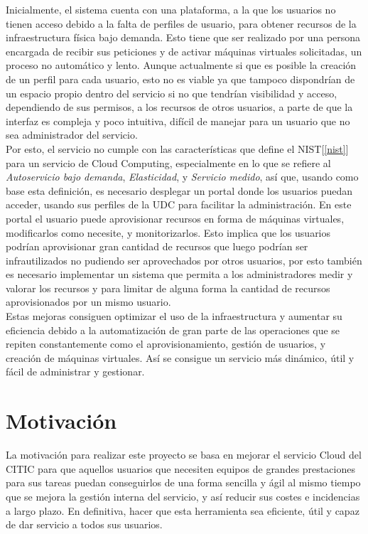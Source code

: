 Inicialmente, el sistema cuenta con una plataforma, a la que los usuarios no tienen acceso debido a la falta de perfiles de usuario, para obtener recursos de la infraestructura física bajo demanda. Esto tiene que ser realizado por una persona encargada de recibir sus peticiones y de activar máquinas virtuales solicitadas, un proceso no automático y lento.
Aunque actualmente si que es posible la creación de un perfil para cada usuario, esto no es viable ya que tampoco dispondrían de un espacio propio dentro del servicio si no que tendrían visibilidad y acceso, dependiendo de sus permisos, a los recursos de otros usuarios, a parte de que la interfaz es compleja y poco intuitiva, difícil de manejar para un usuario que no sea administrador del servicio.\\
Por esto, el servicio no cumple con las características que define el NIST[\ref{nist}] para un servicio de Cloud Computing, especialmente en lo que se refiere al \emph{Autoservicio bajo demanda}, \emph{Elasticidad}, y \emph{Servicio medido}, así que, usando como base esta definición, es necesario desplegar un portal donde los usuarios puedan acceder, usando sus perfiles de la UDC para facilitar la administración. En este portal el usuario puede aprovisionar recursos en forma de máquinas virtuales, modificarlos como necesite, y monitorizarlos. Esto implica que los usuarios podrían aprovisionar gran cantidad de recursos que luego podrían ser infrautilizados no pudiendo ser aprovechados por otros usuarios, por esto también es necesario implementar un sistema que permita a los administradores medir y valorar los recursos y para limitar de alguna forma la cantidad de recursos aprovisionados por un mismo usuario.\\

Estas mejoras consiguen optimizar el uso de la infraestructura y aumentar su eficiencia debido a la automatización de gran parte de las operaciones que se repiten constantemente como el aprovisionamiento, gestión de usuarios, y creación de máquinas virtuales. Así se consigue un servicio más dinámico, útil y fácil de administrar y gestionar.



\section{Motivación}
La motivación para realizar este proyecto se basa en mejorar el servicio Cloud del CITIC para que aquellos usuarios que necesiten equipos de grandes prestaciones para sus tareas puedan conseguirlos de una forma sencilla y ágil al mismo tiempo que se mejora la gestión interna del servicio, y así reducir sus costes e incidencias a largo plazo. En definitiva, hacer que esta herramienta sea eficiente, útil y capaz de dar servicio a todos sus usuarios.


